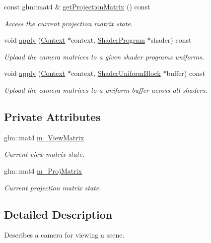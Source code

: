 \begin{DoxyCompactItemize}
const glm\+::mat4 \& \hyperlink{class_camera_a02898d27ba55e88b3bed38d41be55215}{get\+Projection\+Matrix} () const 
\begin{DoxyCompactList}\small\item\em Access the current projection matrix state. \end{DoxyCompactList}\item 
void \hyperlink{class_camera_a390070b89f45af162d48fca2e70ea299}{apply} (\hyperlink{class_context}{Context} $\ast$context, \hyperlink{class_shader_program}{Shader\+Program} $\ast$shader) const 
\begin{DoxyCompactList}\small\item\em Upload the camera matrices to a given shader program\textquotesingle{}s uniforms. \end{DoxyCompactList}\item 
void \hyperlink{class_camera_a05a6d1c771d22375d60cdf249fbb2492}{apply} (\hyperlink{class_context}{Context} $\ast$context, \hyperlink{class_shader_uniform_block}{Shader\+Uniform\+Block} $\ast$buffer) const 
\begin{DoxyCompactList}\small\item\em Upload the camera matrices to a uniform buffer across all shaders. \end{DoxyCompactList}\end{DoxyCompactItemize}
\subsection*{Private Attributes}
\begin{DoxyCompactItemize}
\item 
glm\+::mat4 \hyperlink{class_camera_a678ced6db61f473f65734c8a1522ea80}{m\+\_\+\+View\+Matrix}
\begin{DoxyCompactList}\small\item\em Current view matrix state. \end{DoxyCompactList}\item 
glm\+::mat4 \hyperlink{class_camera_a60d7a52ef114cb65fd2a079deceb5ccf}{m\+\_\+\+Proj\+Matrix}
\begin{DoxyCompactList}\small\item\em Current projection matrix state. \end{DoxyCompactList}\end{DoxyCompactItemize}


\subsection{Detailed Description}
Describes a camera for viewing a scene. 

